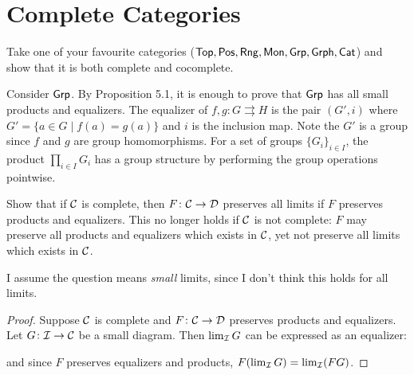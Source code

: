 \section{Complete Categories}

\begin{exercise}{42}
    Take one of your favourite categories ($\normalfont\mathsf{Top}, \normalfont\mathsf{Pos}, \normalfont\mathsf{Rng}, \normalfont\mathsf{Mon}, \normalfont\mathsf{Grp}, \normalfont\mathsf{Grph}, \normalfont\mathsf{Cat}$) and show that it is both complete and cocomplete.
\end{exercise}
\begin{solution}
    Consider $\normalfont\mathsf{Grp}$. 
    By Proposition 5.1, it is enough to prove that $\normalfont\mathsf{Grp}$ has all small products and equalizers.
    The equalizer of $f,g\colon G\rightrightarrows  H$ is the pair $(G', i)$ where $G'=\{a\in G\mid f(a)=g(a)\}$ and $i$ is the inclusion map.
    Note the $G'$ is a group since $f$ and $g$ are group homomorphisms.
    For a set of groups $\{G_i\}_{i\in I}$, the product $\prod_{i\in I} G_i$ has a group structure by performing the group operations pointwise.
\end{solution}

\begin{exercise}{43}
    Show that if $\mathcal{C}$ is complete, then $F\colon\mathcal{C}\to\mathcal{D}$ preserves all limits if $F$ preserves products and equalizers.
    This no longer holds if $\mathcal{C}$ is not complete: $F$ may preserve all products and equalizers which exists in $\mathcal{C}$, yet not preserve all limits which exists in $\mathcal{C}$.
\end{exercise}
\begin{solution}
    I assume the question means \textit{small} limits, since I don't think this holds for all limits.
    \begin{proof}
        Suppose $\mathcal{C}$ is complete and $F\colon\mathcal{C}\to\mathcal{D}$ preserves products and equalizers.
        Let $G\colon\mathcal{I}\to\mathcal{C}$ be a small diagram. Then $\lim_{\mathcal{I}} G$ can be expressed as an equalizer:
       \begin{center}
       \end{center}
       and since $F$ preserves equalizers and products, $F(\lim_{\mathcal{I}} G)=\lim_{\mathcal{I}} (FG)$.
    \end{proof}
\end{solution}


